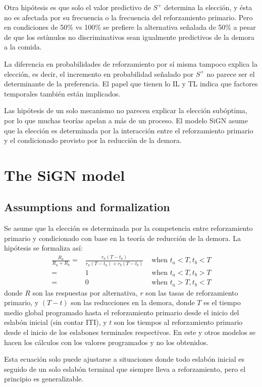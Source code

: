 \documentclass[a4paper,12pt]{article}
\begin{document}
Otra hipótesis es que solo el valor predictivo de $S^{+}$ determina la elección, y ésta no es afectada por su frecuencia o la frecuencia del reforzamiento primario.
Pero en condiciones de 50\% vs 100\% se prefiere la alternativa señalada de 50\% a pesar de que los estímulos no discriminativos sean igualmente predictivos de la demora a la comida.

La diferencia en probabilidades de reforzamiento por sí misma tampoco explica la elección, es decir, el incremento en probabilidad señalado por $S^{+}$ no parece ser el determinante de la preferencia.
El papel que tienen lo IL y TL indica que factores temporales también están implicados.

Las hipótesis de un solo mecanismo no parecen explicar la elección subóptima, por lo que muchas teorías apelan a más de un proceso.
El modelo SiGN asume que la elección es determinada por la interacción entre el reforzamiento primario y el condicionado provisto por la reducción de la demora.

\section{The SiGN model}

\subsection{Assumptions and formalization}

Se asume que la elección es determinada por la competencia entre reforzamiento primario y condicionado con base en la teoría de reducción de la demora.
La hipótesis se formaliza así:
\[
\begin{array}{rlr}
    \frac{
        R_{a}
    }{
        R_{a} + R_{b}
    }=&
    \frac{
        r_{a}(T - t_{a})
    }{
        r_{a}(T - t_{a}) + r_{b}(T - t_{b})
    } &\mbox{ when }t_{a} < T, t_{b} < T\\
    =& 1 &\mbox{ when } t_{a} < T, t_{b} > T\\
    =& 0 & \mbox{ when } t_{a} > T, t_{b} < T
\end{array}
\]
donde $R$ son las respuestas por alternativa, $r$ son las tasas de reforzamiento primario, y $(T - t)$ son las reducciones en la demora, donde $T$ es el tiempo medio global programado hasta el reforzamiento primario desde el inicio del eslabón inicial (sin contar ITI), y $t$ son los tiempos al reforzamiento primario desde el inicio de los eslabones terminales respectivos.
En este y otros modelos se hacen los cálculos con los valores programados y no los obtenidos.

Esta ecuación solo puede ajustarse a situaciones donde todo eslabón inicial es seguido de un solo eslabón terminal que siempre lleva a reforzamiento, pero el principio es generalizable.
\end{document}
